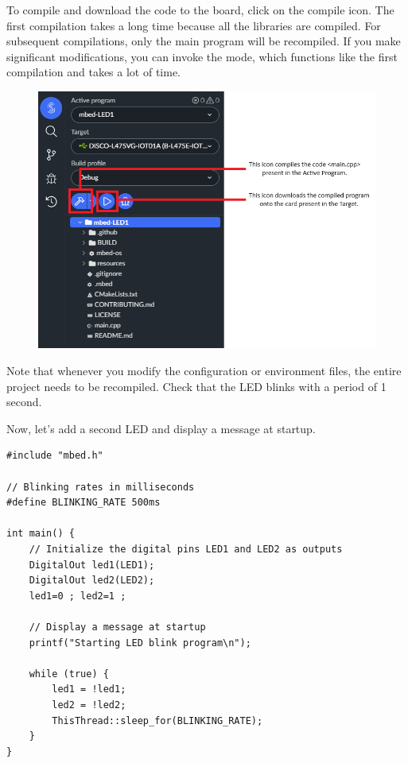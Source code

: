 \documentclass[10pt,a4paper,onecolumn]{article}
\let\textttOrig=\texttt
\def\texttt#1{\expandafter\textttOrig{\seqsplit{#1}}}
\begin{document}
To compile and download the code to the board, click on the compile icon. The first compilation takes a long time because all the libraries are compiled. For subsequent compilations, only the main program \texttt{main.cpp} will be recompiled. If you make significant modifications, you can invoke the \texttt{Clean Build} mode, which functions like the first compilation and takes a lot of time.

\begin{figure}[H]
    \centering
    \includegraphics[width=\dimexpr\textwidth-1cm\relax,height=\dimexpr0.25\textheight-1cm\relax,keepaspectratio]{images/5.png}
\end{figure}

Note that whenever you modify the configuration or environment files, the entire project needs to be recompiled. Check that the LED blinks with a period of 1 second.

Now, let's add a second LED and display a message at startup.

\begin{lstlisting}[style=CStyle]
#include "mbed.h"

// Blinking rates in milliseconds
#define BLINKING_RATE 500ms

int main() {
    // Initialize the digital pins LED1 and LED2 as outputs
    DigitalOut led1(LED1);
    DigitalOut led2(LED2);
    led1=0 ; led2=1 ;

    // Display a message at startup
    printf("Starting LED blink program\n");

    while (true) {
        led1 = !led1;
        led2 = !led2;
        ThisThread::sleep_for(BLINKING_RATE);
    }
}
\end{lstlisting}
\end{document}
